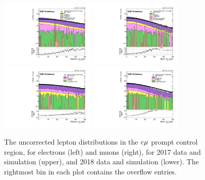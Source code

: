 \begin{figure}
\centering
\includegraphics[width=0.4\textwidth]{figures/corrections/d0_smearing/emu_2017/electronAbsD0_50um_uncorrected.pdf} 
\includegraphics[width=0.4\textwidth]{figures/corrections/d0_smearing/emu_2017/muonAbsD0_50um_uncorrected.pdf}
\includegraphics[width=0.4\textwidth]{figures/corrections/d0_smearing/emu_2018/electronAbsD0_50um_uncorrected.pdf} 
\includegraphics[width=0.4\textwidth]{figures/corrections/d0_smearing/emu_2018/muonAbsD0_50um_uncorrected.pdf}
\caption{The uncorrected lepton \ad distributions in the $e{\mu}$ prompt control region, for electrons (left) and muons (right), for 2017 data and simulation (upper), and 2018 data and simulation (lower). The rightmost bin in each plot
contains the overflow entries.}
\label{uncorrected_d0}
\end{figure}